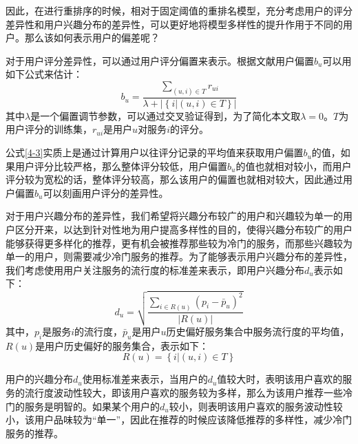 \documentclass[master,winfonts]{njuthesis}
\begin{document}
因此，在进行重排序的时候，相对于固定阈值的重排名模型，充分考虑用户的评分差异性和用户兴趣分布的差异性，可以更好地将模型多样性的提升作用于不同的用户。那么该如何表示用户的偏差呢？

对于用户评分差异性，可以通过用户评分偏置来表示。根据文献\cite{彭飞2012加入用户评分偏置的推荐系统排名模型}用户偏置$b_u$可以用如下公式来估计：
\begin{equation}
b_u=\frac{\sum\limits_{(u,i)\in T}r_{ui}}{\lambda+\left | \left \{ i|(u,i)\in T \right \} \right |}\label{4-3}
\end{equation}
其中$\lambda$是一个偏置调节参数，可以通过交叉验证得到，为了简化本文取$\lambda = 0$。$T$为用户评分的训练集，$r_{ui}$是用户$u$对服务$i$的评分。

公式\eqref{4-3}实质上是通过计算用户以往评分记录的平均值来获取用户偏置$b_u$的值，如果用户评分比较严格，那么整体评分较低，用户偏置$b_u$的值也就相对较小，而用户评分较为宽松的话，整体评分较高，那么该用户的偏置也就相对较大，因此通过用户偏置$b_u$可以刻画用户评分的差异性。

对于用户兴趣分布的差异性，我们希望将兴趣分布较广的用户和兴趣较为单一的用户区分开来，以达到针对性地为用户提高多样性的目的，使得兴趣分布较广的用户能够获得更多样化的推荐，更有机会被推荐那些较为冷门的服务，而那些兴趣较为单一的用户，则需要减少冷门服务的推荐。为了能够表示用户兴趣分布的差异性，我们考虑使用用户关注服务的流行度的标准差来表示，即用户兴趣分布$d_u$表示如下：
\begin{equation}
d_u = \sqrt{\frac{\sum \limits_{i \in R(u)}(p_i-\bar{p}_u)^2}{\left | R(u) \right |}}
\end{equation}
其中，$p_i$是服务$i$的流行度，$\bar{p}_u$是用户$u$历史偏好服务集合中服务流行度的平均值，$R(u)$是用户历史偏好的服务集合，表示如下：
\begin{equation}
R(u)=\left \{ i|(u,i)\in T \right \} 
\end{equation}

用户的兴趣分布$d_u$使用标准差来表示，当用户的$d_u$值较大时，表明该用户喜欢的服务的流行度波动性较大，即该用户喜欢的服务较为多样，那么为该用户推荐一些冷门的服务是明智的。如果某个用户的$d_u$较小，则表明该用户喜欢的服务波动性较小，该用户品味较为“单一”，因此在推荐的时候应该降低推荐的多样性，减少冷门服务的推荐。
\end{document}
